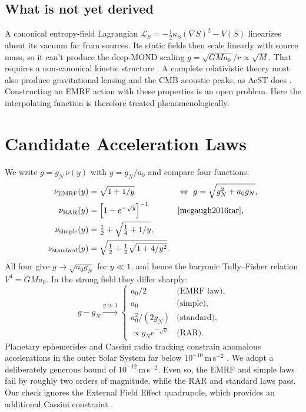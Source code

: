 \documentclass[11pt,a4paper]{article}
\begin{document}
\subsection{What is not yet derived}
A canonical entropy-field Lagrangian $\mathcal{L}_S = -\tfrac12\kappa_S(\nabla S)^2 - V(S)$ linearizes about its vacuum far from sources. Its static fields then scale linearly with source mass, so it can't produce the deep-MOND scaling $g = \sqrt{GMa_0}/r \propto \sqrt{M}$. That requires a non-canonical kinetic structure \cite{bekenstein1984}. A complete relativistic theory must also produce gravitational lensing and the CMB acoustic peaks, as AeST does \cite{skordis2021}. Constructing an EMRF action with these properties is an open problem. Here the interpolating function is therefore treated phenomenologically.

\section{Candidate Acceleration Laws}
\label{sec:laws}
We write $g = g_N\,\nu(y)$ with $y = g_N/a_0$ and compare four functions:
\begin{align}
\nu_{\mathrm{EMRF}}(y) &= \sqrt{1 + 1/y} &&\Leftrightarrow\ g = \sqrt{g_N^2 + a_0 g_N},\\
\nu_{\mathrm{RAR}}(y) &= \left[1 - e^{-\sqrt{y}}\right]^{-1} && \text{\cite{mcgaugh2016rar}},\\
\nu_{\mathrm{simple}}(y) &= \tfrac12 + \sqrt{\tfrac14 + 1/y},\\
\nu_{\mathrm{standard}}(y) &= \sqrt{\tfrac12 + \tfrac12\sqrt{1 + 4/y^2}}.
\end{align}
All four give $g \to \sqrt{a_0 g_N}$ for $y \ll 1$, and hence the baryonic Tully--Fisher relation $V^4 = GMa_0$. In the strong field they differ sharply:
\begin{equation}
g - g_N \xrightarrow{y\gg1}
\begin{cases}
a_0/2 & \text{(EMRF law)},\\
a_0 & \text{(simple)},\\
a_0^2/(2g_N) & \text{(standard)},\\
\propto g_N e^{-\sqrt{y}} & \text{(RAR)}.
\end{cases}
\label{eq:strong}
\end{equation}
Planetary ephemerides and Cassini radio tracking constrain anomalous accelerations in the outer Solar System far below $10^{-10}$\,m\,s$^{-2}$ \cite{hees2014,hees2016}. We adopt a deliberately generous bound of $10^{-12}$\,m\,s$^{-2}$. Even so, the EMRF and simple laws fail by roughly two orders of magnitude, while the RAR and standard laws pass. Our check ignores the External Field Effect quadrupole, which provides an additional Cassini constraint \cite{hees2014,hees2016}.
\end{document}
